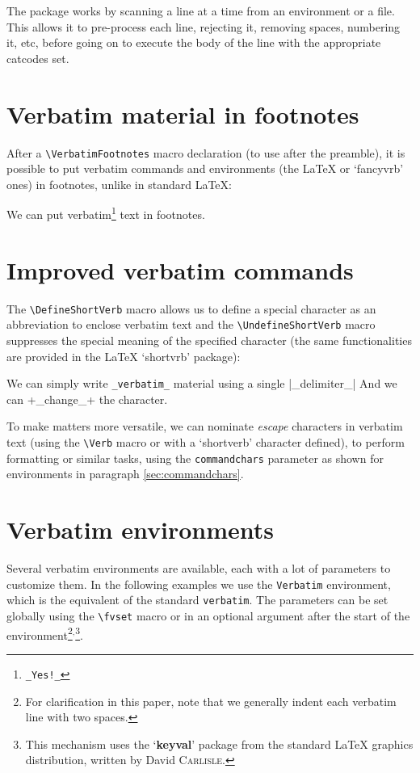 \documentclass[twoside]{article}
\newcommand\FVrbPackage{`\textsf{fancyvrb}'}
\newcommand\cs[1]{\texttt{\textbackslash#1}}
\begin{document}
  The package works by scanning a line at a time from an environment or a
file. This allows it to pre-process each line, rejecting it, removing
spaces, numbering it, etc, before going on to execute the body of the line
with the appropriate catcodes set.

\section{Verbatim material in footnotes}

  After a \cs{VerbatimFootnotes} macro declaration (to use after the
preamble), it is possible to put verbatim commands and environments
(the \LaTeX{} or \FVrbPackage{} ones) in footnotes, unlike in standard
\LaTeX:

\begin{Example}
  \VerbatimFootnotes
  We can put verbatim\footnote{\verb+_Yes!_+} text in footnotes.
\end{Example}

\section{Improved verbatim commands}
%
  The \cs{DefineShortVerb} macro allows us to define a special character as
an abbreviation to enclose verbatim text and the \cs{UndefineShortVerb}
macro suppresses the special meaning of the specified character (the same
functionalities are provided in the \LaTeX{} `\textsf{shortvrb}' package):


\begin{SideBySideExample}
  \DefineShortVerb{\|}
  We can simply write \Verb+_verbatim_+
  material using a single |_delimiter_|
  \UndefineShortVerb{\|}
  \DefineShortVerb{\+}
  And we can +_change_+ the character.
\end{SideBySideExample}

  To make matters more versatile, we can nominate \emph{escape} characters
in verbatim text (using the \cs{Verb} macro or with a `shortverb' character
defined), to perform formatting or similar tasks, using the
\texttt{commandchars} parameter as shown for environments in paragraph
\ref{sec:commandchars}.

\section{Verbatim environments}

Several verbatim environments are available, each with a lot of
parameters to customize them. In the following examples we use the
\texttt{Verbatim} environment, which is the equivalent of the standard
\texttt{verbatim}. The parameters can be set globally using the \cs{fvset}
macro or in an optional argument after the start of the
environment\footnote{For clarification in this paper, note that we
generally indent each verbatim line with two
spaces.}$^,$\footnote{This mechanism uses the
`\textbf{keyval}' package from the standard \LaTeX{} graphics
distribution, written by David \textsc{Carlisle}.}.
\end{document}
